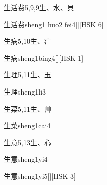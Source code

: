 \begin{entry}{生活费}{5,9,9}{⽣、⽔、⾙}
  \begin{phonetics}{生活费}{sheng1 huo2 fei4}[][HSK 6]
  \end{phonetics}
\end{entry}

\begin{entry}{生病}{5,10}{⽣、⽧}
  \begin{phonetics}{生病}{sheng1bing4}[][HSK 1]
  \end{phonetics}
\end{entry}

\begin{entry}{生理}{5,11}{⽣、⽟}
  \begin{phonetics}{生理}{sheng1li3}
  \end{phonetics}
\end{entry}

\begin{entry}{生菜}{5,11}{⽣、⾋}
  \begin{phonetics}{生菜}{sheng1cai4}
  \end{phonetics}
\end{entry}

\begin{entry}{生意}{5,13}{⽣、⼼}
  \begin{phonetics}{生意}{sheng1yi4}
  \end{phonetics}
  \begin{phonetics}{生意}{sheng1yi5}[][HSK 3]
  \end{phonetics}
\end{entry}


